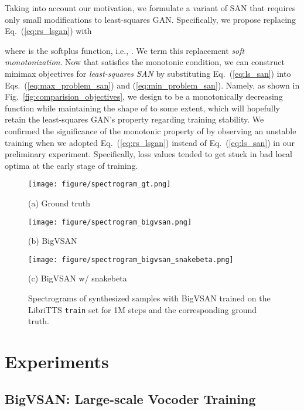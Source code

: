 \documentclass{article}
\def\beqref#1{(\ref{#1})}
\begin{document}
Taking into account our motivation, we formulate a variant of SAN that requires only small modifications to least-squares GAN. Specifically, we propose replacing Eq.~\beqref{eq:rs_lsgan} with

where  is the softplus function, i.e., . We term this replacement \textit{soft monotonization}. Now that  satisfies the monotonic condition, we can construct minimax objectives for \textit{least-squares SAN} by substituting Eq.~\beqref{eq:ls_san} into Eqs.~\beqref{eq:max_problem_san} and \beqref{eq:min_problem_san}. Namely, as shown in Fig.~\ref{fig:comparision_objectives}, we design  to be a monotonically decreasing function while maintaining the shape of  to some extent, which will hopefully retain the least-squares GAN's property regarding training stability. We confirmed the significance of the monotonic property of  by observing an unstable training when we adopted Eq.~\beqref{eq:rs_lsgan} instead of Eq.~\beqref{eq:ls_san} in our preliminary experiment. Specifically, loss values tended to get stuck in bad local optima at the early stage of training.

\begin{figure*}[htb]
\begin{minipage}[b]{0.3\linewidth}
  \centering
  \centerline{\texttt{[image: figure/spectrogram\_gt.png]}}
  \centerline{(a) Ground truth}\medskip
\end{minipage}
\hfill
\begin{minipage}[b]{.3\linewidth}
  \centering
  \centerline{\texttt{[image: figure/spectrogram\_bigvsan.png]}}
  \centerline{(b) BigVSAN}\medskip
\end{minipage}
\hfill
\begin{minipage}[b]{0.3\linewidth}
  \centering
  \centerline{\texttt{[image: figure/spectrogram\_bigvsan\_snakebeta.png]}}
  \centerline{(c) BigVSAN w/ snakebeta}\medskip
\end{minipage}
\caption{Spectrograms of synthesized samples with BigVSAN trained on the LibriTTS \texttt{train} set for 1M steps and the corresponding ground truth.}
\label{fig:comparision_spectrograms}
\end{figure*}

\section{Experiments}
\label{sec:experiments}

\subsection{BigVSAN: Large-scale Vocoder Training}
\end{document}
